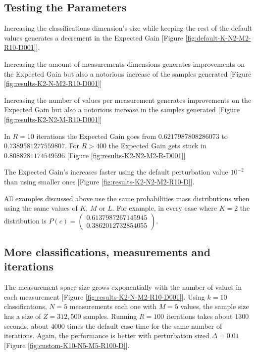 \documentclass[letterpaper, conference]{IEEEtran}
\begin{document}
\subsection{Testing the Parameters}

Increasing the classifications dimension's size while keeping the rest of the default values generates a decrement in the Expected Gain [Figure \ref{fig:default-K-N2-M2-R10-D001}].



Increasing the amount of measurements dimensions generates improvements on the Expected Gain but also a notorious increase of the samples generated [Figure \ref{fig:results-K2-N-M2-R10-D001}]



Increasing the number of values per measurement generates improvements on the Expected Gain but also a notorious increase in the samples generated [Figure \ref{fig:results-K2-N2-M-R10-D001}]



In $R = 10$ iterations the Expected Gain goes from $0.6217987808286073$ to $0.7389581277559807$. For $R > 400$ the Expected Gain gets stuck in $0.8088281174549596$ [Figure \ref{fig:results-K2-N2-M2-R-D001}]



The Expected Gain's increases faster using the default perturbation value $10^{-2}$ than using smaller ones [Figure \ref{fig:results-K2-N2-M2-R10-D}].



All examples discussed above use the same probabilities mass distributions when using the same values of $K$, $M$ or $L$. For example, in every case where $K = 2$ the distribution is $P(c) = \begin{pmatrix}0.6137987267145945\\0.3862012732854055\end{pmatrix}$.

\subsection{More classifications, measurements and iterations}

The measurement space size grows exponentially with the number of values in each measurement [Figure \ref{fig:results-K2-N-M2-R10-D001}]. Using $k =10$ classifications, $N = 5$ measurements each one with $M = 5$ values, the sample size has a size of $Z = 312,500$ samples. Running $R = 100$ iterations takes about $1300$ seconds, about $4000$ times the default case time for the same number of iterations. Again, the performance is better with perturbation sized $\Delta = 0.01$ [Figure \ref{fig:custom-K10-N5-M5-R100-D}].
\end{document}
